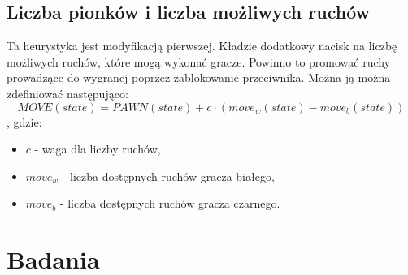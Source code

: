 \documentclass{article}
\begin{document}
	\subsection{Liczba pionków i liczba możliwych ruchów}
	Ta heurystyka jest modyfikacją pierwszej. Kładzie dodatkowy nacisk na liczbę możliwych ruchów, które mogą wykonać gracze. Powinno to promować ruchy prowadzące do wygranej poprzez zablokowanie przeciwnika. Można ją można zdefiniować następująco:
	\begin{equation}
	MOVE(state) = PAWN(state) + c \cdot (move_w(state) - move_b(state))
	\end{equation}
	, gdzie:
	\begin{itemize}
		\item $c$ - waga dla liczby ruchów,
		\item $move_w$ - liczba dostępnych ruchów gracza białego,
		\item $move_b$ - liczba dostępnych ruchów gracza czarnego.
	\end{itemize}
	\section{Badania}
\end{document}
